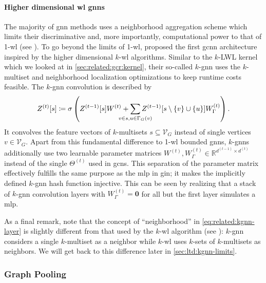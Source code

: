 \paragraph{Higher dimensional \ac{wl} \acp{gnn}}
The majority of \ac{gnn} methods uses a neighborhood aggregation scheme which limits their discriminative and, more importantly, computational power to that of 1-\acs{wl} (see ).
To go beyond the limits of 1-\acs{wl}, \citet{Morris2019} proposed the first \ac{gcnn} architecture inspired by the higher dimensional $k$-\acs{wl} algorithms.
Similar to the $k$-LWL kernel which we looked at in \cref{sec:related:gcr:kernel}, their so-called $k$-\acs{gnn} uses the $k$-multiset and neighborhood localization optimizations to keep runtime costs feasible.
The $k$-\ac{gnn} convolution is described by
\begin{align}
	Z^{(t)}[s] \coloneqq \sigma\left( {Z^{(t-1)}[s]} W^{(t)} + \smashoperator[lr]{\sum_{{v \in s}, {u \in \Gamma_G(v)}}} {Z^{(t-1)}[s \setminus \{ v \} \cup \{ u \}]} W_{\Gamma}^{(t)} \right) \text{.} \label{eq:related:kgnn-layer}
\end{align}
It convolves the feature vectors of $k$-multisets $s \subseteq \mathcal{V}_G$ instead of single vertices $v \in \mathcal{V}_G$.
Apart from this fundamental difference to 1-\acs{wl} bounded \acp{gnn}, $k$-\acp{gnn} additionally use two learnable parameter matrices $W^{(t)}, W_{\Gamma}^{(t)} \in \mathbb{R}^{d^{(t-1)} \times d^{(t)}}$ instead of the single $\Theta^{(t)}$ used in \acp{gcn}.
This separation of the parameter matrix effectively fulfills the same purpose as the \ac{mlp} in \ac{gin}; it makes the implicitly defined $k$-\acs{gnn} hash function injective.
This can be seen by realizing that a stack of $k$-\acs{gnn} convolution layers with $W_{\Gamma}^{(t)} = \mathbf{0}$ for all but the first layer simulates a \ac{mlp}.

As a final remark, note that the concept of ``neighborhood'' in \cref{eq:related:kgnn-layer} is slightly different from that used by the $k$-\acs{wl} algorithm (see ):
$k$-\acs{gnn} considers a single $k$-multiset as a neighbor while $k$-\acs{wl} uses $k$-sets of $k$-multisets as neighbors.
We will get back to this difference later in \cref{sec:ltd:kgnn-limits}.

\subsubsection{Graph Pooling}

